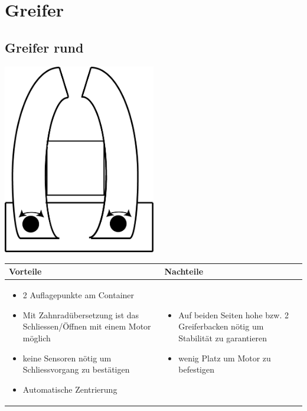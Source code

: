 
\section{Greifer}


\subsection{Greifer rund}

\includegraphics[width=0.5\textwidth]{fig/Greifer_rund.png}

\begin{table}[h]
\begin{tabular}{p{} | p{}}


 \textbf{Vorteile} & \textbf{Nachteile} \\ \hline
	 
\begin{itemize}
\item 2 Auflagepunkte am Container
\item Mit Zahnradübersetzung ist das Schliessen/Öffnen mit einem Motor möglich
\item keine Sensoren nötig um Schliessvorgang zu bestätigen
\item Automatische Zentrierung
\end{itemize}

 
 &
 
\begin{itemize}
\item Auf beiden Seiten hohe bzw. 2 Greiferbacken nötig um Stabilität zu garantieren
\item wenig Platz um Motor zu befestigen
\end{itemize}

\end{tabular}
\end{table}


